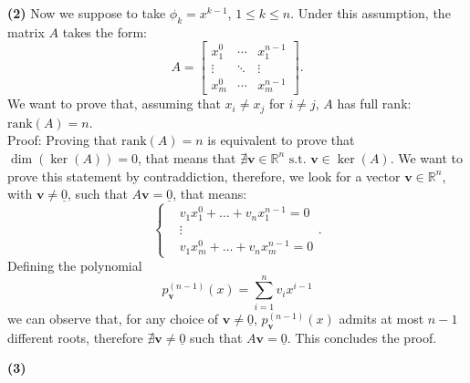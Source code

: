 \documentclass[a4paper,11pt]{article}
\newcommand{\R}{\mathbb{R}}
\begin{document}
\noindent \textbf{(2)} Now we suppose to take $\phi_k = x^{k-1}$, $1 \le k \le n$. Under this assumption, the matrix $A$ takes the form:
\begin{equation}\label{key}
	A = \begin{bmatrix}
		x_1^0 & \cdots & x_1^{n-1}  \\
		\vdots & \ddots & \vdots \\
		x_m^0 & \cdots  & x_m^{n-1}
	\end{bmatrix}.
\end{equation}
We want to prove that, assuming that $x_i\neq x_j$ for $i \neq j$, $A$ has full rank: $\text{rank}(A) = n$.\\
Proof: Proving that $\text{rank}(A) = n$ is equivalent to prove that $\dim(\ker(A)) = 0$, that means that $\nexists \textbf{v} \in \R^n \text{ s.t. } \textbf{v} \in \ker(A)$. We want to prove this statement by contraddiction, therefore, we look for a vector $\textbf{v} \in \R^n$, with $\textbf{v} \neq \underline{0}$, such that $A\textbf{v}=\underline{0}$, that means:
\begin{equation}\label{key}
	\left\lbrace 
	\begin{split}
		&  v_1 x_1^0 + \dots + v_n x_1^{n-1} = 0\\
		& \vdots  \\
		&  v_1 x_m^0 + \dots + v_n x_m^{n-1} = 0 
	\end{split} \right.  .
\end{equation}
Defining the polynomial 
\begin{equation}\label{key}
	p^{(n-1)}_{\textbf{v}}(x) = \sum_{i=1}^{n} v_i x^{i-1}
\end{equation}
we can observe that, for any choice of $\textbf{v} \neq \underline{0}$, $p^{(n-1)}_{\textbf{v}}(x)$ admits at most $n-1$ different roots, therefore $\nexists \textbf{v} \neq \underline{0}$ such that $A\textbf{v}=\underline{0}$. This concludes the proof. \qedsymbol

\noindent \textbf{(3)}
\end{document}
